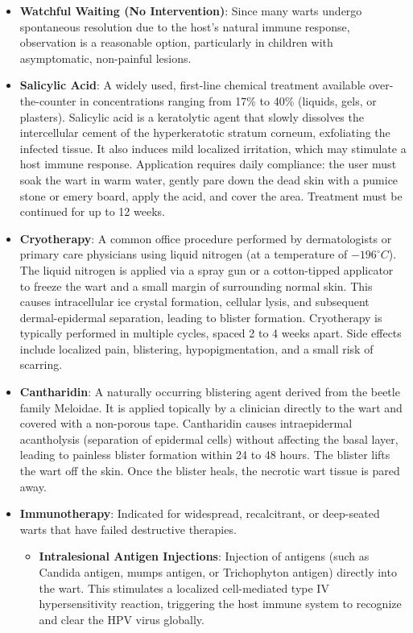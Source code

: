 \begin{itemize}
    \item \textbf{Watchful Waiting (No Intervention)}: Since many warts undergo spontaneous resolution due to the host's natural immune response, observation is a reasonable option, particularly in children with asymptomatic, non-painful lesions.
    \item \textbf{Salicylic Acid}: A widely used, first-line chemical treatment available over-the-counter in concentrations ranging from 17\% to 40\% (liquids, gels, or plasters). Salicylic acid is a keratolytic agent that slowly dissolves the intercellular cement of the hyperkeratotic stratum corneum, exfoliating the infected tissue. It also induces mild localized irritation, which may stimulate a host immune response. Application requires daily compliance: the user must soak the wart in warm water, gently pare down the dead skin with a pumice stone or emery board, apply the acid, and cover the area. Treatment must be continued for up to 12 weeks.
    \item \textbf{Cryotherapy}: A common office procedure performed by dermatologists or primary care physicians using liquid nitrogen (at a temperature of $-196^{\circ}C$). The liquid nitrogen is applied via a spray gun or a cotton-tipped applicator to freeze the wart and a small margin of surrounding normal skin. This causes intracellular ice crystal formation, cellular lysis, and subsequent dermal-epidermal separation, leading to blister formation. Cryotherapy is typically performed in multiple cycles, spaced 2 to 4 weeks apart. Side effects include localized pain, blistering, hypopigmentation, and a small risk of scarring.
    \item \textbf{Cantharidin}: A naturally occurring blistering agent derived from the beetle family Meloidae. It is applied topically by a clinician directly to the wart and covered with a non-porous tape. Cantharidin causes intraepidermal acantholysis (separation of epidermal cells) without affecting the basal layer, leading to painless blister formation within 24 to 48 hours. The blister lifts the wart off the skin. Once the blister heals, the necrotic wart tissue is pared away.
    \item \textbf{Immunotherapy}: Indicated for widespread, recalcitrant, or deep-seated warts that have failed destructive therapies.
    \begin{itemize}
        \item \textbf{Intralesional Antigen Injections}: Injection of antigens (such as Candida antigen, mumps antigen, or Trichophyton antigen) directly into the wart. This stimulates a localized cell-mediated type IV hypersensitivity reaction, triggering the host immune system to recognize and clear the HPV virus globally.

\end{itemize}
\end{itemize}
